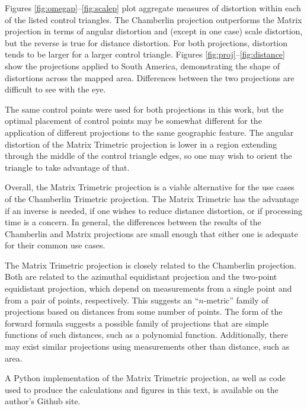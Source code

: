 \documentclass[]{interact}
\begin{document}
Figures \ref{fig:omegap}--\ref{fig:scalep} plot aggregate measures of distortion
within each of the listed control triangles. The Chamberlin projection
outperforms the Matrix projection in terms of angular distortion and (except in
one case) scale distortion, but the reverse is true for distance distortion. For
both projections, distortion tends to be larger for a larger control triangle.
Figures \ref{fig:proj}--\ref{fig:distance} show the projections applied to
South America, demonstrating the shape of distortions across the mapped area.
Differences between the two projections are difficult to see with the eye.

The same control points were used for both projections in this work, but the
optimal placement of control points may be somewhat different for the
application of different projections to the same geographic feature.
The angular distortion of the Matrix Trimetric projection is lower
in a region extending through the middle of the control triangle edges,
so one may wish to orient the triangle to take advantage of that.

Overall, the Matrix Trimetric projection is a viable alternative for the use
cases of the Chamberlin Trimetric projection. The Matrix Trimetric has the
advantage if an inverse is needed, if one wishes to reduce distance distortion,
or if processing time is a concern. In general, the differences between the
results of the Chamberlin and Matrix projections are small enough that either
one is adequate for their common use cases.

The Matrix Trimetric projection is closely related to the Chamberlin projection.
Both are related to the azimuthal equidistant projection and the two-point
equidistant projection, which depend on measurements from a single point and
from a pair of points, respectively. \citep{snyder87} This suggests an
``$n$-metric'' family of projections based on distances from some number of
points. The form of the forward formula suggests a possible family of
projections that are simple functions of such distances, such as a polynomial
function. Additionally, there may exist similar projections using measurements
other than distance, such as area.

A Python implementation of the Matrix Trimetric projection, as well as code used to
produce the calculations and figures in this text,
is available on the author's Github site. \citep{blind}%



\end{document}
